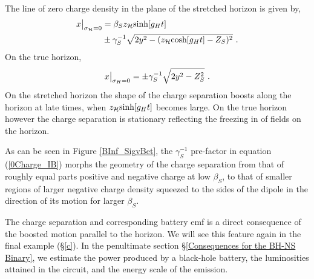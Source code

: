  The line of zero charge density in the plane of the stretched horizon is given by,
\begin{align}
x\big{|}_{\sigma_{\mathcal{H}}=0} &= \beta_S z_{\mathcal{H}}
\hbox{sinh}[g_H t] \nonumber \\
&\pm \gamma^{-1}_S \sqrt{2 y^2 - (z_{\mathcal{H}}
  \hbox{cosh}[g_H t] - Z_S)^2} \ .
\label{HCharge_IB}
\end{align} 
On the true horizon,
\begin{align}
x\big{|}_{\sigma_{H}=0} =  \pm \gamma^{-1}_S \sqrt{ 2 y^2 - Z^2_S } \ .
\label{0Charge_IB}
\end{align} 
On the stretched horizon the shape of the charge separation boosts along the horizon at late times, when $z_{\mathcal{H}} \hbox{sinh}[g_Ht]$ becomes large. On the true horizon however the charge separation is stationary reflecting the freezing in of fields on the horizon. 

As can be seen in Figure \ref{BInf_SigvBet},  the $\gamma^{-1}_S$ pre-factor in equation
(\ref{0Charge_IB}) morphs the geometry of the charge separation from
that of roughly equal parts positive and negative charge at low
$\beta_S$, to that of smaller regions of larger negative charge density
squeezed to the sides of the dipole in the direction of its motion for
larger $\beta_S$. 

The charge separation and corresponding battery emf is a direct
consequence of the boosted motion parallel to the horizon. We will see
this feature again in the final example (\S \ref{c}).
In the penultimate section \S \ref{Consequences for the BH-NS Binary},
we estimate the power produced by a black-hole battery, the luminosities
attained in the circuit, and the energy scale of the emission.

